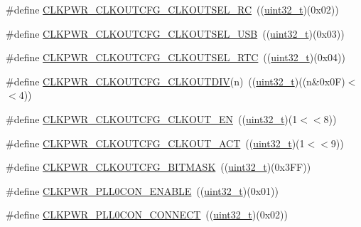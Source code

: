 \begin{DoxyCompactItemize}
\#define \hyperlink{group___c_l_k_p_w_r___private___macros_gafc6adc93d3c02aabd1f07a68f3117e6f}{C\+L\+K\+P\+W\+R\+\_\+\+C\+L\+K\+O\+U\+T\+C\+F\+G\+\_\+\+C\+L\+K\+O\+U\+T\+S\+E\+L\+\_\+\+RC}~((\hyperlink{_p_e___types_8h_a33594304e786b158f3fb30289278f5af}{uint32\+\_\+t})(0x02))
\item 
\#define \hyperlink{group___c_l_k_p_w_r___private___macros_ga479124d29f76b3210575d1d691ba3f83}{C\+L\+K\+P\+W\+R\+\_\+\+C\+L\+K\+O\+U\+T\+C\+F\+G\+\_\+\+C\+L\+K\+O\+U\+T\+S\+E\+L\+\_\+\+U\+SB}~((\hyperlink{_p_e___types_8h_a33594304e786b158f3fb30289278f5af}{uint32\+\_\+t})(0x03))
\item 
\#define \hyperlink{group___c_l_k_p_w_r___private___macros_ga32299db2735461be4a1c196fd37481a0}{C\+L\+K\+P\+W\+R\+\_\+\+C\+L\+K\+O\+U\+T\+C\+F\+G\+\_\+\+C\+L\+K\+O\+U\+T\+S\+E\+L\+\_\+\+R\+TC}~((\hyperlink{_p_e___types_8h_a33594304e786b158f3fb30289278f5af}{uint32\+\_\+t})(0x04))
\item 
\#define \hyperlink{group___c_l_k_p_w_r___private___macros_gafeb09b4c23f05af8a671efde1522342e}{C\+L\+K\+P\+W\+R\+\_\+\+C\+L\+K\+O\+U\+T\+C\+F\+G\+\_\+\+C\+L\+K\+O\+U\+T\+D\+IV}(n)~((\hyperlink{_p_e___types_8h_a33594304e786b158f3fb30289278f5af}{uint32\+\_\+t})((n\&0x0\+F)$<$$<$4))
\item 
\#define \hyperlink{group___c_l_k_p_w_r___private___macros_gaa19d155cbb1df10796e9e37cf0ee8182}{C\+L\+K\+P\+W\+R\+\_\+\+C\+L\+K\+O\+U\+T\+C\+F\+G\+\_\+\+C\+L\+K\+O\+U\+T\+\_\+\+EN}~((\hyperlink{_p_e___types_8h_a33594304e786b158f3fb30289278f5af}{uint32\+\_\+t})(1$<$$<$8))
\item 
\#define \hyperlink{group___c_l_k_p_w_r___private___macros_ga75827422d265c934f086a8da44a51e5a}{C\+L\+K\+P\+W\+R\+\_\+\+C\+L\+K\+O\+U\+T\+C\+F\+G\+\_\+\+C\+L\+K\+O\+U\+T\+\_\+\+A\+CT}~((\hyperlink{_p_e___types_8h_a33594304e786b158f3fb30289278f5af}{uint32\+\_\+t})(1$<$$<$9))
\item 
\#define \hyperlink{group___c_l_k_p_w_r___private___macros_ga4773a06bb00ac608b396f9717b8ed82a}{C\+L\+K\+P\+W\+R\+\_\+\+C\+L\+K\+O\+U\+T\+C\+F\+G\+\_\+\+B\+I\+T\+M\+A\+SK}~((\hyperlink{_p_e___types_8h_a33594304e786b158f3fb30289278f5af}{uint32\+\_\+t})(0x3\+F\+F))
\item 
\#define \hyperlink{group___c_l_k_p_w_r___private___macros_ga1906f68fbb1a9849dd95762b58f68daa}{C\+L\+K\+P\+W\+R\+\_\+\+P\+L\+L0\+C\+O\+N\+\_\+\+E\+N\+A\+B\+LE}~((\hyperlink{_p_e___types_8h_a33594304e786b158f3fb30289278f5af}{uint32\+\_\+t})(0x01))
\item 
\#define \hyperlink{group___c_l_k_p_w_r___private___macros_ga3065f59de6fe4a98ca1d5b32388bc4aa}{C\+L\+K\+P\+W\+R\+\_\+\+P\+L\+L0\+C\+O\+N\+\_\+\+C\+O\+N\+N\+E\+CT}~((\hyperlink{_p_e___types_8h_a33594304e786b158f3fb30289278f5af}{uint32\+\_\+t})(0x02))
$$
\end{DoxyCompactItemize}
